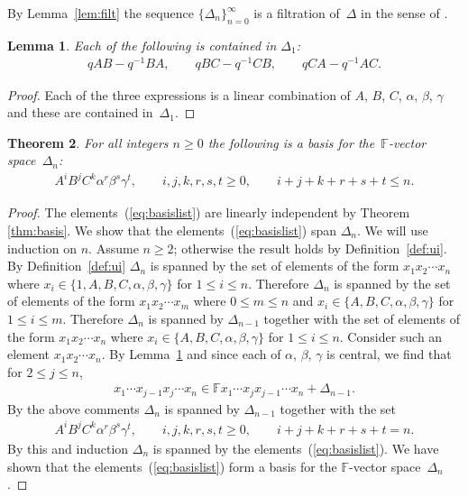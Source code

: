 \documentclass[11pt]{article}
\numberwithin{equation}{section}
\newtheorem{Theorem}{Theorem}[section]
\newtheorem{Lemma}[Theorem]{Lemma}
\begin{document}
By Lemma~\ref{lem:filt} the sequence
$\lbrace \Delta_n\rbrace_{n=0}^\infty$ is a f\/iltration of~$\Delta$ in the sense of
\cite[p.~202]{carter}.


\begin{Lemma}
\label{lem:almostcom}
Each of the following is contained in $\Delta_1$:
\begin{gather*}
qAB-q^{-1}BA,
\qquad
qBC-q^{-1}CB,
\qquad
qCA-q^{-1}AC.
\end{gather*}
\end{Lemma}

\begin{proof}
Each of the three expressions is a linear combination of
$A$, $B$, $C$, $\alpha$, $\beta$, $\gamma$ and these are contained in~$\Delta_1$.
\end{proof}

\begin{Theorem}\label{lem:unbasis}
For all integers $n\geq 0$ the following is
a basis for the~$\mathbb F$-vector space~$\Delta_n$:
\begin{gather}
\label{eq:basislist}
A^iB^jC^k\alpha^r \beta^s \gamma^t, \qquad
i,j,k,r,s,t\geq 0, \qquad
i+j+k+r+s+t \leq n.
\end{gather}
\end{Theorem}

\begin{proof}
The elements~(\ref{eq:basislist}) are linearly independent by
Theorem
\ref{thm:basis}. We show that the
elements~(\ref{eq:basislist}) span $\Delta_n$.
We will use induction on $n$. Assume $n\geq 2$; otherwise
the result holds by Def\/inition~\ref{def:ui}.
By Def\/inition~\ref{def:ui} $\Delta_n$ is
spanned by the set of elements of the form
$x_1x_2\cdots x_n$
where $x_i \in \lbrace 1, A,B,C,\alpha,\beta,\gamma\rbrace$
for $1 \leq i \leq n$.
Therefore $\Delta_n$ is spanned by the set of elements
of the form
$x_1x_2\cdots x_m$ where $0 \leq m\leq n$ and
$x_i \in \lbrace A,B,C,\alpha,\beta,\gamma\rbrace$
for $1 \leq i \leq m$.
Therefore $\Delta_n$ is spanned by $\Delta_{n-1}$ together with
the set of elements
of the form
$x_1x_2\cdots x_n$ where
$x_i \in \lbrace A,B,C,\alpha,\beta,\gamma\rbrace$
for $1 \leq i \leq n$.
Consider such an element
$x_1x_2\cdots x_n$.
By Lemma~\ref{lem:almostcom} and since
each of $\alpha$, $\beta$, $\gamma$ is central,
we f\/ind that
for $2 \leq j \leq n$,
\begin{gather*}
x_1\cdots  x_{j-1}x_j\cdots  x_n \in
\mathbb F x_1\cdots x_{j}x_{j-1}\cdots  x_n + \Delta_{n-1}.
\end{gather*}
By the above comments
$\Delta_n$ is spanned by $\Delta_{n-1}$ together with the
set
\begin{gather*}
A^iB^jC^k\alpha^r \beta^s \gamma^t, \qquad
i,j,k,r,s,t\geq 0, \qquad
i+j+k+r+s+t = n.
\end{gather*}
By this and induction
$\Delta_n$ is spanned by the elements~(\ref{eq:basislist}).
We have shown that
the elements~(\ref{eq:basislist}) form a basis  for the $\mathbb F$-vector space~$\Delta_n$.
\end{proof}
\end{document}
